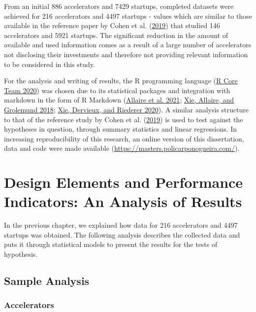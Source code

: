 \documentclass[
  12pt,
]{article}
\begin{document}
From an initial 886 accelerators and 7429 startups, completed datasets were achieved for 216 accelerators and 4497 startups - values which are similar to those available in the reference paper by Cohen et al. (\protect\hyperlink{ref-cohen_design_2019}{2019}) that studied 146 accelerators and 5921 startups. The significant reduction in the amount of available and used information comes as a result of a large number of accelerators not disclosing their investments and therefore not providing relevant information to be considered in this study.

For the analysis and writing of results, the R programming language (\protect\hyperlink{ref-r_2020}{R Core Team 2020}) was chosen due to its statistical packages and integration with markdown in the form of R Markdown (\protect\hyperlink{ref-rmd_dynamic_2021}{Allaire et al. 2021}; \protect\hyperlink{ref-rmd_definitive_2018}{Xie, Allaire, and Grolemund 2018}; \protect\hyperlink{ref-rmd_cookbook_2020}{Xie, Dervieux, and Riederer 2020}). A similar analysis structure to that of the reference study by Cohen et al. (\protect\hyperlink{ref-cohen_design_2019}{2019}) is used to test against the hypotheses in question, through summary statistics and linear regressions. In increasing reproducibility of this research, an online version of this dissertation, data and code were made available (\url{https://masters.policarponogueira.com/}).

\clearpage

\hypertarget{analysis-of-results}{%
\section{Design Elements and Performance Indicators: An Analysis of Results}\label{analysis-of-results}}

In the previous chapter, we explained how data for 216 accelerators and 4497 startups was obtained. The following analysis describes the collected data and puts it through statistical models to present the results for the tests of hypothesis.

\hypertarget{sample-analysis}{%
\subsection{Sample Analysis}\label{sample-analysis}}

\hypertarget{accelerators}{%
\subsubsection{Accelerators}\label{accelerators}}
\end{document}
